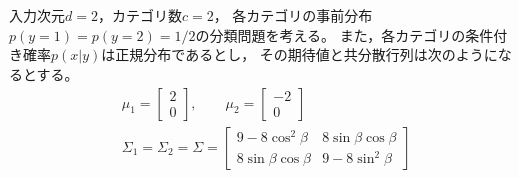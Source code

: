\documentclass[class=jsarticle, crop=false, dvipdfmx, fleqn]{standalone}
\begin{document}
\section{}

入力次元\(d = 2\)，カテゴリ数\(c = 2\)，
各カテゴリの事前分布\(p(y=1) = p(y=2) = 1/2 \)の分類問題を考える。
また，各カテゴリの条件付き確率\(p(x|y)\)は正規分布であるとし，
その期待値と共分散行列は次のようになるとする。
\begin{align}
	& \mu_1 = \begin{bmatrix} 2 \\ 0 \end{bmatrix}, \qquad
	\mu_2 = \begin{bmatrix} -2 \\ 0 \end{bmatrix} \\
	& \Sigma_1 = \Sigma_2 = \Sigma = 
		\begin{bmatrix}
			9-8{\cos}^2 \beta & 8 \sin\beta \cos\beta \\
			8 \sin\beta \cos\beta & 9-8{\sin}^2 \beta
		\end{bmatrix}
\end{align}
\end{document}
